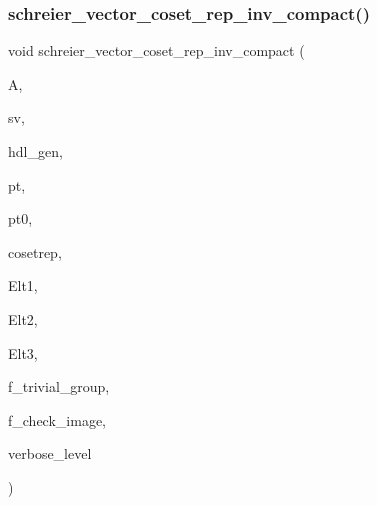 \subsubsection{\texorpdfstring{schreier\+\_\+vector\+\_\+coset\+\_\+rep\+\_\+inv\+\_\+compact()}{schreier\_vector\_coset\_rep\_inv\_compact()}}
{\footnotesize\ttfamily void schreier\+\_\+vector\+\_\+coset\+\_\+rep\+\_\+inv\+\_\+compact (\begin{DoxyParamCaption}\item[{\mbox{\hyperlink{classaction}{action}} $\ast$}]{A,  }\item[{\mbox{\hyperlink{galois_8h_a09fddde158a3a20bd2dcadb609de11dc}{I\+NT}} $\ast$}]{sv,  }\item[{\mbox{\hyperlink{galois_8h_a09fddde158a3a20bd2dcadb609de11dc}{I\+NT}} $\ast$}]{hdl\+\_\+gen,  }\item[{\mbox{\hyperlink{galois_8h_a09fddde158a3a20bd2dcadb609de11dc}{I\+NT}}}]{pt,  }\item[{\mbox{\hyperlink{galois_8h_a09fddde158a3a20bd2dcadb609de11dc}{I\+NT}} \&}]{pt0,  }\item[{\mbox{\hyperlink{galois_8h_a09fddde158a3a20bd2dcadb609de11dc}{I\+NT}} $\ast$}]{cosetrep,  }\item[{\mbox{\hyperlink{galois_8h_a09fddde158a3a20bd2dcadb609de11dc}{I\+NT}} $\ast$}]{Elt1,  }\item[{\mbox{\hyperlink{galois_8h_a09fddde158a3a20bd2dcadb609de11dc}{I\+NT}} $\ast$}]{Elt2,  }\item[{\mbox{\hyperlink{galois_8h_a09fddde158a3a20bd2dcadb609de11dc}{I\+NT}} $\ast$}]{Elt3,  }\item[{\mbox{\hyperlink{galois_8h_a09fddde158a3a20bd2dcadb609de11dc}{I\+NT}}}]{f\+\_\+trivial\+\_\+group,  }\item[{\mbox{\hyperlink{galois_8h_a09fddde158a3a20bd2dcadb609de11dc}{I\+NT}}}]{f\+\_\+check\+\_\+image,  }\item[{\mbox{\hyperlink{galois_8h_a09fddde158a3a20bd2dcadb609de11dc}{I\+NT}}}]{verbose\+\_\+level }\end{DoxyParamCaption})}

\mbox{\label{schreier__vector_8_c_ad9ac7140a52f76b86359724af7484cf7}} 

